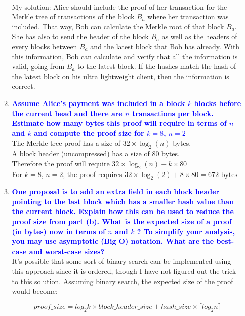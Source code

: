 \documentclass[11pt]{article}
\begin{document}
\begin{enumerate}
\begin{enumerate}
    
        \\ My solution: Alice should include the proof of her transaction for the Merkle tree of transactions of the block $B_a$  where her transaction was included. That way, Bob can calculate the Merkle root of that block $B_a$. She has also to send the header of the block $B_a$ as well as the headers of every blocks between $B_a$ and the latest block that Bob has already. With this information, Bob can calculate and verify that all the information is valid, going from $B_a$ to the latest block. If the hashes match the hash of the latest block on his ultra lightweight client, then the information is correct.
    \item \textbf{\textcolor{blue}{Assume Alice's payment was included in a block $k$ blocks before the current head and there are $n$ transactions per block. Estimate how many bytes this proof will require in terms of $n$ and $k$ and compute the proof size for $k=8$, $n=2$}}
        \\ The Merkle tree proof has a size of $32 \times \log_2(n)$ bytes.
        \\ A block header (uncompressed) has a size of $80$ bytes.
        \\ Therefore the proof will require $32 \times \log_2(n) + k \times 80$
        \\ For $k=8$, $n=2$, the proof requires $32 \times \log_2(2) + 8 \times 80 = 672 \text{ bytes}$
    \item \textbf{\textcolor{blue}{One proposal is to add an extra field in each block header pointing to the last block which has a smaller hash value than the current block. Explain how this can be used to reduce the proof size from part (b). What is the expected size of a proof (in bytes) now in terms of $n$ and $k$ ? To simplify your analysis, you may use asymptotic (Big O) notation. What are the best-case and worst-case sizes?}}
        \\ It's possible that some sort of binary search can be implemented using this approach since it is ordered, though I have not figured out the trick to this solution. Assuming binary search, the expected size of the proof would become:
        
        $$proof\_size = log_2k \times block\_header\_size + hash\_size \times \lceil log_2n \rceil$$
    \end{enumerate}
    

\end{enumerate}
\end{document}

